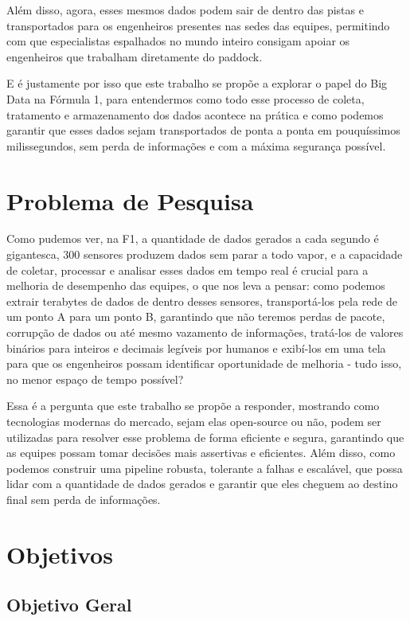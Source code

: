 \documentclass[12pt, %
openright, 
oneside, %
a4paper,    %
brazil]{facom-ufu-abntex2}
\begin{document}
Além disso, agora, esses mesmos dados podem sair de dentro das pistas e transportados para os engenheiros presentes nas sedes das equipes, permitindo com que especialistas espalhados no mundo inteiro consigam
apoiar os engenheiros que trabalham diretamente do paddock.

E é justamente por isso que este trabalho se propõe a explorar o papel do Big Data na Fórmula 1, para entendermos como todo esse processo de coleta, tratamento e armazenamento dos dados
acontece na prática e como podemos garantir que esses dados sejam transportados de ponta a ponta em pouquíssimos milissegundos, sem perda de informações e com a máxima segurança possível.

\section{Problema de Pesquisa}

Como pudemos ver, na F1, a quantidade de dados gerados a cada segundo é gigantesca, 300 sensores produzem dados sem parar a todo vapor, e a capacidade de coletar, processar e analisar esses dados em tempo real é crucial para a melhoria de desempenho das equipes, o que nos leva
a pensar: como podemos extrair terabytes de dados de dentro desses sensores, transportá-los pela rede de um ponto A para um ponto B, garantindo que não teremos perdas de pacote, corrupção de dados ou até mesmo vazamento de informações,
tratá-los de valores binários para inteiros e decimais legíveis por humanos e exibí-los em uma tela para que os engenheiros possam identificar oportunidade de melhoria - tudo isso, no menor espaço de tempo possível?

Essa é a pergunta que este trabalho se propõe a responder, mostrando como tecnologias modernas do mercado, sejam elas open-source ou não, podem ser utilizadas para resolver esse problema de forma eficiente e segura, garantindo que as equipes possam tomar decisões mais assertivas e eficientes.
Além disso, como podemos construir uma pipeline robusta, tolerante a falhas e escalável, que possa lidar com a quantidade de dados gerados e garantir que eles cheguem ao destino final sem perda de informações.

\section{Objetivos}
\subsection{Objetivo Geral}
\end{document}
